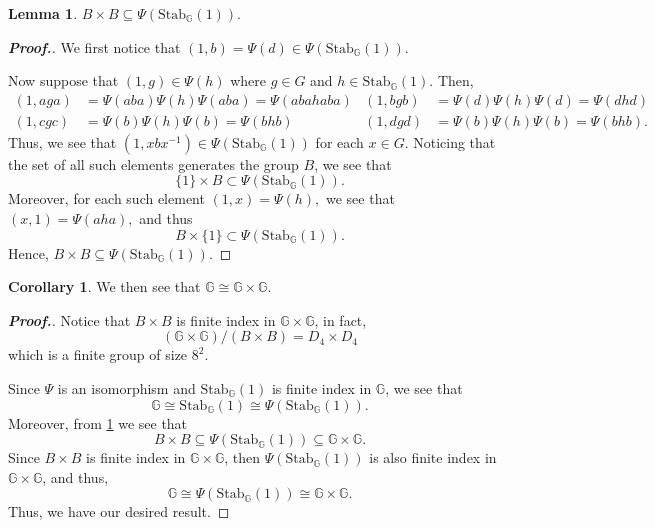 \documentclass[11pt,a4paper,reqno]{amsart}
\theoremstyle{plain}
\theoremstyle{definition}
\newtheorem{lemma}[theorem]{Lemma}
\newtheorem{corollary}{Corollary}[theorem]
\theoremstyle{definition}
\newenvironment{myproof}{\begin{proof}[\normalfont\bfseries Proof.]}{\end{proof}}
\begin{document}
\begin{lemma}\label{lem:BBsubgroup}
  $B \times B \subseteq \Psi(\mathrm{Stab}_{\mathbb G}(1))$.
\end{lemma}

\begin{myproof}
We first notice that $(1,b) = \Psi(d) \in \Psi(\mathrm{Stab}_{\mathbb G}(1))$.

Now suppose that $(1,g) \in \Psi(h)$ where $g\in G$ and $h\in \mathrm{Stab}_{\mathbb G}(1)$.
Then,
\begin{align*}
  (1,aga)
  &=
  \Psi(aba) \Psi(h) \Psi(aba)
  =
  \Psi(abahaba)
&
  (1,bgb)
  &=
  \Psi(d) \Psi(h) \Psi(d)
  =
  \Psi(dhd)
\\
  (1,cgc)
  &=
  \Psi(b) \Psi(h) \Psi(b)
  =
  \Psi(bhb)
&
  (1,dgd)
  &=
  \Psi(b) \Psi(h) \Psi(b)
  =
  \Psi(bhb).
\end{align*}
Thus, we see that $(1,xbx^{-1}) \in \Psi(\mathrm{Stab}_{\mathbb G}(1))$ for each $x\in G$.
Noticing that the set of all such elements generates the group $B$, we see that
\[
  \{1\}\times B \subset \Psi(\mathrm{Stab}_{\mathbb G}(1)).
\]
Moreover, for each such element
$
  (1,x) = \Psi(h),
$
we see that
$
  (x,1) = \Psi(aha),
$
and thus
\[
  B\times \{1\} \subset \Psi(\mathrm{Stab}_{\mathbb G}(1)).
\]
Hence, $B\times B \subseteq \Psi(\mathrm{Stab}_{\mathbb G}(1))$.
\end{myproof}

\begin{corollary}\label{cor:Gcong}
  We then see that $\mathbb G \cong \mathbb G\times \mathbb G$.
\end{corollary}

\begin{myproof}
Notice that $B \times B$ is finite index in $\mathbb G \times \mathbb G$, in fact,
\[
  (\mathbb G\times \mathbb G)/ (B \times B) = D_4 \times D_4
\]
which is a finite group of size $8^2$.

Since $\Psi$ is an isomorphism and $\mathrm{Stab}_{\mathbb G}(1)$ is finite index in $\mathbb G$, we see that
\[
  \mathbb G \cong \mathrm{Stab}_{\mathbb G}(1)\cong \Psi(\mathrm{Stab}_{\mathbb G}(1)).
\]
Moreover, from \cref{lem:BBsubgroup} we see that
\[
  B\times B \subseteq \Psi(\mathrm{Stab}_{\mathbb G}(1)) \subseteq \mathbb G \times \mathbb G.
\]
Since $B \times B$ is finite index in $\mathbb G \times \mathbb G$, then 
$\Psi(\mathrm{Stab}_{\mathbb G}(1))$ is also finite index in $\mathbb G\times \mathbb G$, and thus,
\[
  \mathbb G \cong \Psi(\mathrm{Stab}_{\mathbb G}(1)) \cong \mathbb G \times \mathbb G.
\]
Thus, we have our desired result.
\end{myproof}
\end{document}

